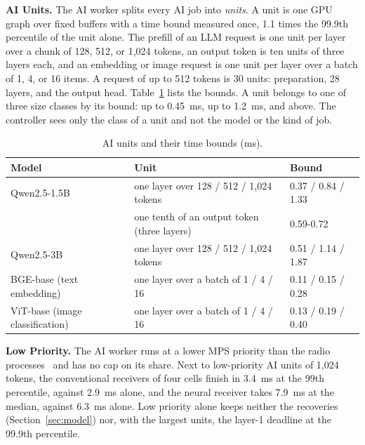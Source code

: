 \documentclass[acmsmall,screen,review,anonymous]{acmart}
\begin{document}
\noindent\textbf{AI Units.} The AI worker splits every AI job into \emph{units}. A unit is one GPU graph
over fixed buffers with a time bound measured once, 1.1 times the 99.9th percentile of the unit alone. The
prefill of an LLM request is one unit per layer over a chunk of 128, 512, or 1,024 tokens, an output token
is ten units of three layers each, and an embedding or image request is one unit per layer over a batch of
1, 4, or 16 items. A request of up to 512 tokens is 30 units: preparation, 28 layers, and the output head.
Table~\ref{tab:units} lists the bounds. A unit belongs to one of three size classes by its
bound: up to 0.45~ms, up to 1.2~ms, and above. The controller sees only the class of a unit and not the
model or the kind of job.

\begin{table}[t]
\caption{AI units and their time bounds (ms).}
\label{tab:units}
\footnotesize
\begin{tabular}{@{}lll@{}}
\toprule
Model & Unit & Bound \\
\midrule
Qwen2.5-1.5B & one layer over 128 / 512 / 1,024 tokens & 0.37 / 0.84 / 1.33 \\
 & one tenth of an output token (three layers) & 0.59-0.72 \\
Qwen2.5-3B & one layer over 128 / 512 / 1,024 tokens & 0.51 / 1.14 / 1.87 \\
BGE-base (text embedding) & one layer over a batch of 1 / 4 / 16 & 0.11 / 0.15 / 0.28 \\
ViT-base (image classification) & one layer over a batch of 1 / 4 / 16 & 0.13 / 0.19 / 0.40 \\
\bottomrule
\end{tabular}
\end{table}

\noindent\textbf{Low Priority.} The AI worker runs at a lower MPS priority than the radio
processes~\cite{nvidiampS} and has no cap on its share. Next to low-priority AI units of 1,024 tokens, the
conventional receivers of four cells finish in 3.4~ms at the 99th percentile, against 2.9~ms alone, and the
neural receiver takes 7.9~ms at the median, against 6.3~ms alone. Low priority alone keeps neither the
recoveries (Section~\ref{sec:model}) nor, with the largest units, the layer-1 deadline at the 99.9th
percentile.
\end{document}
